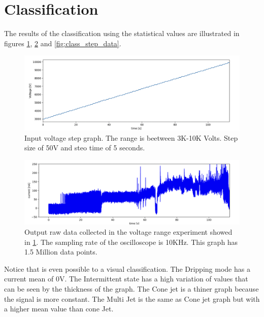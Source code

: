 \section{Classification}
\label{sec:classification_results}

The results of the classification using the statistical values are illustrated in figures \ref{fig:step_voltage}, \ref{fig:raw_data} and \ref{fig:class_step_data}.


\begin{figure}[H]
    \center
    \includegraphics[width=12cm]{Figuras/19:03/voltage_step.png}
    \caption{Input voltage step graph. The range is beetween 3K-10K Volts. Step size of 50V and steo time of 5 seconds.}
    \label{fig:step_voltage}
\end{figure}


\begin{figure}[H]
    \center
    \includegraphics[width=12cm]{Figuras/19:03/raw-data-example.png}
    \caption{Output raw data collected in the voltage range experiment showed in \ref{fig:step_voltage}. The sampling rate of the oscilloscope is 10KHz. This graph has 1.5 Million data points.}
    \label{fig:raw_data}
\end{figure}

Notice that is even possible to a visual classification. The Dripping mode has a current mean of 0V. The Intermittent state has a high variation of values that can be seen by the thickness of the graph. The Cone jet is a thiner graph because the signal is more constant. The Multi Jet is the same as Cone jet graph but with a higher mean value than cone Jet.


